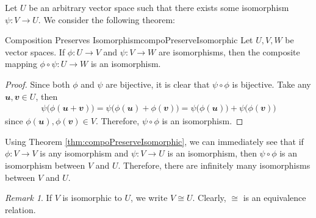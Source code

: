 \documentclass[math, code]{amznotes}
\theoremstyle{remark}
\newtheorem*{remark}{Remark}
\begin{document}
Let $U$ be an arbitrary vector space such that there exists some isomorphism $\psi \colon V \to U$. We consider the following theorem:
\begin{thmbox}{Composition Preserves Isomorphism}{compoPreserveIsomorphic}
    Let $U, V, W$ be vector spaces. If $\phi \colon U \to V$ and $\psi \colon V \to W$ are isomorphisms, then the composite mapping $\phi \circ \psi \colon U \to W$ is an isomorphism.
    \tcblower
    \begin{proof}
        Since both $\phi$ and $\psi$ are bijective, it is clear that $\psi \circ \phi$ is bijective. Take any $\mathbfit{u}, \mathbfit{v} \in U$, then
        \begin{align*}
            \psi\bigl(\phi(\mathbfit{u + v})\bigr) = \psi\bigl(\phi(\mathbfit{u}) + \phi(\mathbfit{v})\bigr) = \psi\bigl(\phi(\mathbfit{u})\bigr) + \psi\bigl(\phi(\mathbfit{v})\bigr)
        \end{align*}
        since $\phi(\mathbfit{u}), \phi(\mathbfit{v}) \in V$. Therefore, $\psi \circ \phi$ is an isomorphism.
    \end{proof}
\end{thmbox}
Using Theorem \ref{thm:compoPreserveIsomorphic}, we can immediately see that if $\phi \colon V \to V$ is any isomorphism and $\psi \colon V \to U$ is an isomorphism, then $\psi \circ \phi$ is an isomorphism between $V$ and $U$. Therefore, there are infinitely many isomorphisms between $V$ and $U$.
\begin{notebox}
    \begin{remark}
        If $V$ is isomorphic to $U$, we write $V \cong U$. Clearly, $\cong$ is an equivalence relation.
    \end{remark}
\end{notebox}
\end{document}
